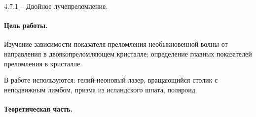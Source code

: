 \documentclass{../lab_class}
\begin{document}
{\Large 4.7.1 -- Двойное лучепреломление.}

\paragraph{Цель работы.}
Изучение  зависимости  показателя  преломления необыкновенной волны от направления в двоякопреломляющем кристалле; определение главных показателей преломления в кристалле.

В работе используются: гелий-неоновый лазер, вращающийся столик с неподвижным лимбом, призма из исландского шпата, поляроид.

\paragraph{Теоретическая часть.}
\end{document}
